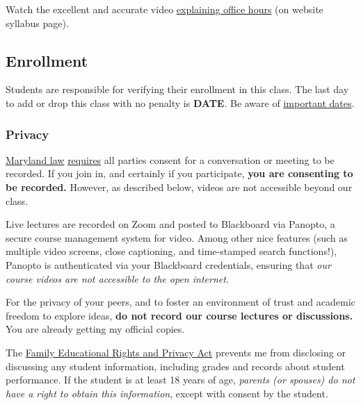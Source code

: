 \documentclass{article}
\begin{document}
Watch the excellent and accurate video
\href{https://vimeo.com/270014784}{explaining office hours} (on website
syllabus page).

\hypertarget{enrollment}{%
\subsection*{Enrollment}\label{enrollment}}

Students are responsible for verifying their enrollment in this class.
The last day to add or drop this class with no penalty is \textbf{DATE}.
Be aware of
\href{https://www.hood.edu/offices-services/registrars-office/academic-calendar}{important
dates}.

\hypertarget{privacy}{%
\subsubsection*{Privacy}\label{privacy}}

\href{https://www.execvision.io/blog/maryland-call-recording-laws/}{Maryland
law}
\href{https://law.justia.com/codes/maryland/2005/gcj/10-402.html}{requires}
all parties consent for a conversation or meeting to be recorded. If you
join in, and certainly if you participate, \textbf{you are consenting to
be recorded.} However, as described below, videos are not accessible
beyond our class.

Live lectures are recorded on Zoom and posted to Blackboard via Panopto,
a secure course management system for video. Among other nice features
(such as multiple video screens, close captioning, and time-stamped
search functions!), Panopto is authenticated via your Blackboard
credentials, ensuring that \emph{our course videos are not accessible to
the open internet.}

For the privacy of your peers, and to foster an environment of trust and
academic freedom to explore ideas, \textbf{do not record our course
lectures or discussions.} You are already getting my official copies.

The
\href{https://www2.ed.gov/policy/gen/guid/fpco/ferpa/index.html}{Family
Educational Rights and Privacy Act} prevents me from disclosing or
discussing any student information, including grades and records about
student performance. If the student is at least 18 years of age,
\emph{parents (or spouses) do not have a right to obtain this
information}, except with consent by the student.
\end{document}
